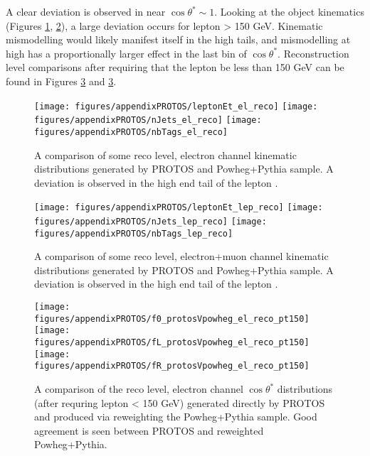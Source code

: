 A clear deviation is observed in \fr near $\cos\theta^*\sim1$. Looking at the object kinematics (Figures \ref{fig:powhegVprotos_el_kin}, \ref{fig:powhegVprotos_lep_kin}), a large deviation occurs for lepton \pt > 150 GeV. Kinematic mismodelling would likely manifest itself in the high \pt tails, and mismodelling at high \pt has a proportionally larger effect in the last bin of $\cos\theta^*$. Reconstruction level comparisons after requiring that the lepton \pt be less than 150 GeV can be found in Figures \ref{fig:powhegVprotos_el_reco_pt150} and \ref{fig:powhegVprotos_el_reco_pt150}.

\begin{figure}[htbp]
\begin{center}
		\texttt{[image: figures/appendixPROTOS/leptonEt\_el\_reco]}
		\texttt{[image: figures/appendixPROTOS/nJets\_el\_reco]}
		\texttt{[image: figures/appendixPROTOS/nbTags\_el\_reco]}
	\caption{A comparison of some reco level, electron channel kinematic distributions generated by PROTOS and Powheg+Pythia sample. A deviation is observed in the high end tail of the lepton \pt.}
	\label{fig:powhegVprotos_el_kin}
\end{center}	
\end{figure}

\begin{figure}[htbp]
\begin{center}
                \texttt{[image: figures/appendixPROTOS/leptonEt\_lep\_reco]}
		\texttt{[image: figures/appendixPROTOS/nJets\_lep\_reco]}
		\texttt{[image: figures/appendixPROTOS/nbTags\_lep\_reco]}
	        \caption{A comparison of some reco level, electron+muon channel kinematic distributions generated by PROTOS and Powheg+Pythia sample. A deviation is observed in the high end tail of the lepton \pt.}
        	\label{fig:powhegVprotos_lep_kin}
\end{center}	
\end{figure}


\begin{figure}[htbp]
\begin{center}
		\texttt{[image: figures/appendixPROTOS/f0\_protosVpowheg\_el\_reco\_pt150]}
		\texttt{[image: figures/appendixPROTOS/fL\_protosVpowheg\_el\_reco\_pt150]}
		\texttt{[image: figures/appendixPROTOS/fR\_protosVpowheg\_el\_reco\_pt150]}
	\caption{A comparison of the reco level, electron channel $\cos\theta^*$ distributions (after requring lepton \pt < 150 GeV) generated directly by PROTOS and produced via reweighting the Powheg+Pythia sample. Good agreement is seen between PROTOS and reweighted Powheg+Pythia.}
	\label{fig:powhegVprotos_el_reco_pt150}
\end{center}	
\end{figure}

